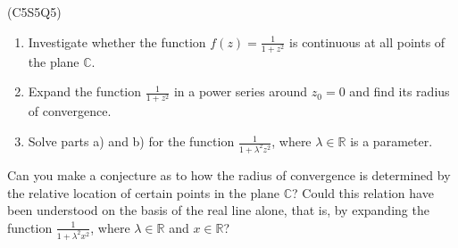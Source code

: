 \begin{prb}
    (C5S5Q5) 
    \begin{enumerate}
        \item[a)] Investigate whether the function $f(z) = \frac{1}{1+z^2}$ is continuous at all points of the plane $\mathbb{C}$.
        \item[b)] Expand the function $\frac{1}{1+z^2}$ in a power series around $z_0 = 0$ and find its radius of convergence.
        \item[c)] Solve parts a) and b) for the function $\frac{1}{1+\lambda^2 z^2}$, where $\lambda \in \mathbb{R}$ is a parameter.
    \end{enumerate}
    Can you make a conjecture as to how the radius of convergence is determined by the relative location of certain points in the plane $\mathbb{C}$? 
    Could this relation have been understood on the basis of the real line alone, that is, by expanding the function $\frac{1}{1+\lambda^2 x^2}$, 
    where $\lambda \in \mathbb{R}$ and $x \in \mathbb{R}$?
\end{prb}


